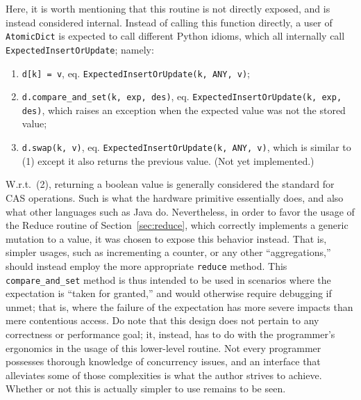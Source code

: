 Here, it is worth mentioning that this routine is not directly exposed, and is instead considered internal.
Instead of calling this function directly, a user of \texttt{AtomicDict} is expected to call different Python idioms, which all internally call \texttt{ExpectedInsertOrUpdate}; namely:

\begin{enumerate}
    \item \texttt{{d[k] = v}}, eq. \texttt{{ExpectedInsertOrUpdate(k, ANY, v)}};
    \item \texttt{{d.compare\_and\_set(k, exp, des)}}, eq. \texttt{{ExpectedInsertOrUpdate(k, exp, des)}}, which raises an exception when the expected value was not the stored value;
    \item \texttt{{d.swap(k, v)}}, eq. \texttt{{ExpectedInsertOrUpdate(k, ANY, v)}}, which is similar to (1) except it also returns the previous value.
    (Not yet implemented.)
\end{enumerate}

W.r.t.\ (2), returning a boolean value is generally considered the standard for CAS operations.
Such is what the hardware primitive essentially does, and also what other languages such as Java do.
Nevertheless, in order to favor the usage of the Reduce routine of Section~\ref{sec:reduce}, which correctly implements a generic mutation to a value, it was chosen to expose this behavior instead.
That is, simpler usages, such as incrementing a counter, or any other ``aggregations,'' should instead employ the more appropriate \texttt{reduce} method.
This \texttt{compare\_and\_set} method is thus intended to be used in scenarios where the expectation is ``taken for granted,'' and would otherwise require debugging if unmet; that is, where the failure of the expectation has more severe impacts than mere contentious access.
Do note that this design does not pertain to any correctness or performance goal; it, instead, has to do with the programmer's ergonomics in the usage of this lower-level routine.
Not every programmer possesses thorough knowledge of concurrency issues, and an interface that alleviates some of those complexities is what the author strives to achieve.
Whether or not this is actually simpler to use remains to be seen.

